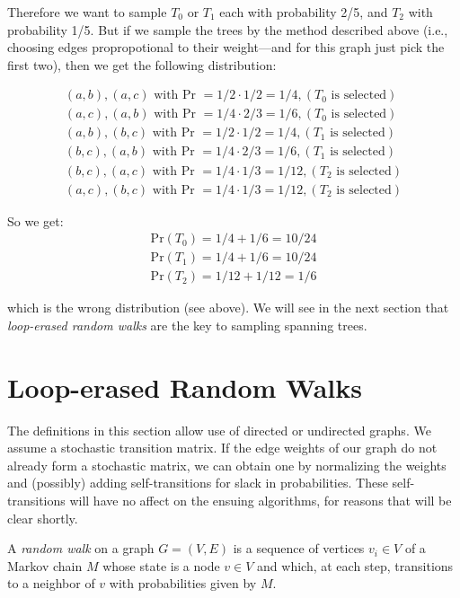 \documentclass[11pt]{article}
\begin{document}
Therefore we want to sample $T_0$ or $T_1$ each with probability 2/5, and $T_2$
with probability 1/5. But if we sample the trees by the method described above
(i.e., choosing edges propropotional to their weight---and for this graph just
pick the first two), then we get the following distribution:

\begin{align*}
(a,b), (a,c)\text{ with Pr }= 1/2 \cdot 1/2 = 1/4, (T_0 \text{ is selected})\\
(a,c), (a,b)\text{ with Pr }= 1/4 \cdot 2/3 = 1/6, (T_0 \text{ is selected})\\
(a,b), (b,c)\text{ with Pr }= 1/2 \cdot 1/2 = 1/4, (T_1 \text{ is selected})\\
(b,c), (a,b)\text{ with Pr }= 1/4 \cdot 2/3 = 1/6, (T_1 \text{ is selected})\\
(b,c), (a,c)\text{ with Pr }= 1/4 \cdot 1/3 = 1/12, (T_2 \text{ is selected})\\
(a,c), (b,c)\text{ with Pr }= 1/4 \cdot 1/3 = 1/12, (T_2 \text{ is selected})
\end{align*}

So we get:
\begin{align*}
\text{Pr}(T_0) = 1/4 + 1/6 = 10/24\\
\text{Pr}(T_1) = 1/4 + 1/6 = 10/24\\
\text{Pr}(T_2) = 1/12 + 1/12 = 1/6
\end{align*}

which is the wrong distribution (see above). We will see in the next section that
\emph{loop-erased random walks} are the key to sampling spanning trees.

\section{Loop-erased Random Walks}

The definitions in this section allow use of directed or undirected graphs. We
assume a stochastic transition matrix. If the edge weights of our graph do not
already form a stochastic matrix, we can obtain one by normalizing the weights
and (possibly) adding self-transitions for slack in probabilities. These
self-transitions will have no affect on the ensuing algorithms, for reasons that
will be clear shortly.

\begin{defn}
A \emph{random walk} on a graph $G=(V,E)$ is a sequence of vertices $v_i \in V$ of a Markov
chain $M$ whose state is a node $v \in V$ and which, at each step, transitions
to a neighbor of $v$ with probabilities given by $M$.
\end{defn}
\end{document}
